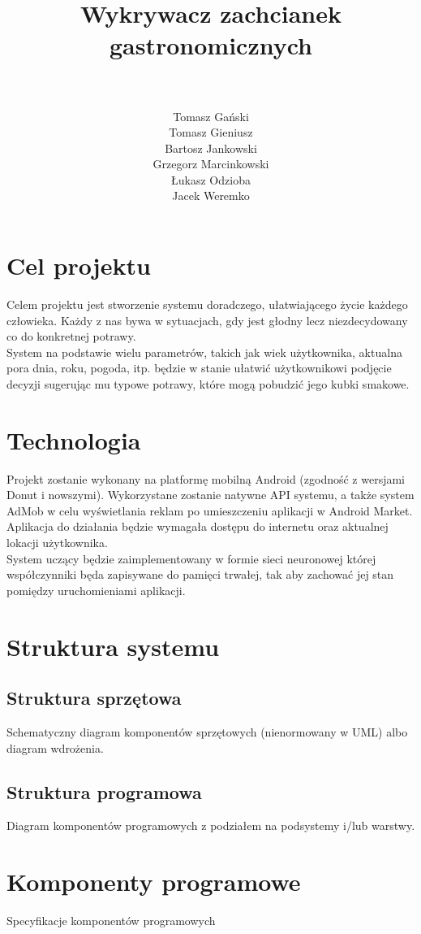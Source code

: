 \documentclass[a4paper,twoside,11pt]{article}
\author{\\ ~ \\ Tomasz Gański \\
Tomasz Gieniusz \\
Bartosz Jankowski\\
Grzegorz Marcinkowski\\
Łukasz Odzioba\\
Jacek Weremko}
\title{\LARGE Wykrywacz zachcianek gastronomicznych}
\begin{document}


\tableofcontents

\newpage

\section{Cel projektu}
Celem projektu jest stworzenie systemu doradczego, ułatwiającego życie każdego człowieka. Każdy z nas bywa w sytuacjach, gdy jest głodny lecz niezdecydowany co do konkretnej potrawy. \\ 

System na podstawie wielu parametrów, takich jak wiek użytkownika, aktualna pora dnia, roku, pogoda, itp. będzie w stanie ułatwić użytkownikowi podjęcie decyzji sugerując mu typowe potrawy, które mogą pobudzić jego kubki smakowe.

\section{Technologia}
Projekt zostanie wykonany na platformę mobilną Android (zgodność z wersjami Donut i nowszymi). Wykorzystane zostanie natywne API systemu, a także system AdMob w celu wyświetlania reklam po umieszczeniu aplikacji w Android Market. \\

Aplikacja do działania będzie wymagała dostępu do internetu oraz aktualnej lokacji użytkownika. \\

System uczący będzie zaimplementowany w formie sieci neuronowej której współczynniki będa zapisywane do pamięci trwałej, tak aby zachować jej stan pomiędzy uruchomieniami aplikacji.

\section{Struktura systemu}
\subsection{Struktura sprzętowa}
Schematyczny diagram komponentów sprzętowych (nienormowany w UML) albo diagram wdrożenia.
\subsection{Struktura programowa}
Diagram komponentów programowych z podziałem na podsystemy i/lub warstwy.

\section{Komponenty programowe}
Specyfikacje komponentów programowych
\end{document}
